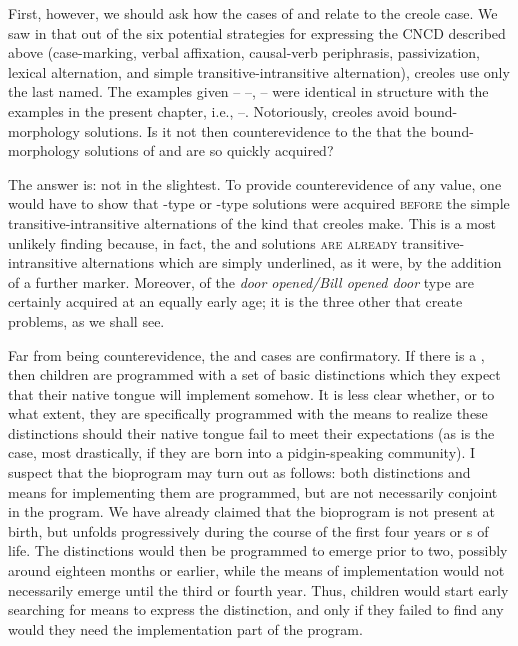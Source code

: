First, however, we should ask how the cases of  and  relate to the creole case. We saw in  that out of the six potential strategies for expressing the CNCD described above (case-marking, verbal affixation, causal-verb periphrasis, passivization, lexical
alternation, and simple transitive-intransitive alternation), creoles use only the last named. The examples given -- --,  -- were identical in structure with the  examples in the present chapter, i.e., --. Notoriously, creoles avoid bound-morphology solutions. Is it not then counterevidence to the  that the bound-morphology solutions of  and  are so quickly acquired?

The answer is: not in the slightest. To provide counterevidence of any value, one would have to show that -type or -type solutions were acquired \textsc{before} the simple transitive-intransitive alternations of the kind that creoles make. This is a most unlikely finding because, in fact, the  and  solutions \textsc{are already} transitive-intransitive alternations which are simply under\-lined, as it were, by the addition of a further marker. Moreover,   of the \textit{door opened/Bill opened door} type are certainly acquired at an equally early age; it is the three other   that create problems, as we shall see.

Far from being counterevidence, the  and  cases are confirmatory. If there is a , then children are programmed with a set of basic distinctions which they expect that their native tongue will implement somehow. It is less clear whether, or to what extent, they are specifically programmed with the means to realize these distinctions should their native tongue fail to meet their expectations (as is the case, most drastically, if they are born into a pidgin-speaking community). I suspect that the bioprogram may turn out as follows: both distinctions and means for implementing them are programmed, but are not necessarily conjoint in the program. We have already claimed that the bioprogram is not present at birth, but unfolds progressively during the course of the first four years or s of life. The distinctions would then be programmed to emerge prior to two, possibly around eighteen months or earlier, while the means of implementation would not necessarily emerge until the third or fourth year. Thus, children would start early searching for means to express the distinction, and only if they failed to find any
would they need the implementation part of the program.

